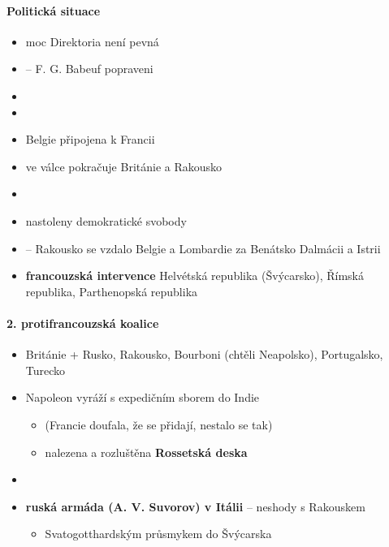 \paragraph{Politická situace}
\begin{itemize}
\item moc Direktoria není pevná
\item {} -- F. G. Babeuf \ra popraveni
\item {}
\item {}
\item Belgie připojena k Francii
\item ve válce pokračuje Británie a Rakousko
\item {}
\item nastoleny demokratické svobody
\item {} -- Rakousko se vzdalo Belgie a Lombardie za Benátsko Dalmácii a Istrii
\item \textbf{francouzská intervence} \ra Helvétská republika (Švýcarsko), Římská republika, Parthenopská republika
\end{itemize}

\paragraph{2. protifrancouzská koalice}
\begin{itemize}
\item Británie + Rusko, Rakousko, Bourboni (chtěli Neapolsko), Portugalsko, Turecko
\item Napoleon vyráží s expedičním sborem do Indie
	\begin{itemize}
	\item {} (Francie doufala, že se přidají, nestalo se tak)
	\item nalezena a rozluštěna \textbf{Rossetská deska}
	\end{itemize}
\item {}
\item \textbf{ruská armáda (A. V. Suvorov) v Itálii} -- neshody s Rakouskem
	\begin{itemize}
	\item Svatogotthardským průsmykem do Švýcarska
	\end{itemize}
\end{itemize}

